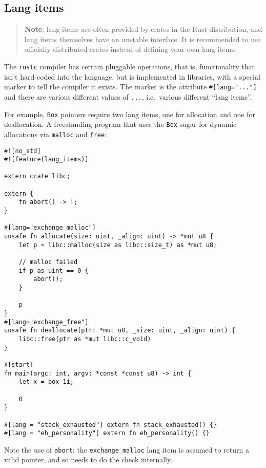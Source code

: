 \documentclass[]{article}
\begin{document}
\subsection{Lang items}\label{lang-items}

\begin{quote}
\textbf{Note}: lang items are often provided by crates in the Rust
distribution, and lang items themselves have an unstable interface. It
is recommended to use officially distributed crates instead of defining
your own lang items.
\end{quote}

The \texttt{rustc} compiler has certain pluggable operations, that is,
functionality that isn't hard-coded into the language, but is
implemented in libraries, with a special marker to tell the compiler it
exists. The marker is the attribute \texttt{\#{[}lang="..."{]}} and
there are various different values of \texttt{...}, i.e.~various
different ``lang items''.

For example, \texttt{Box} pointers require two lang items, one for
allocation and one for deallocation. A freestanding program that uses
the \texttt{Box} sugar for dynamic allocations via \texttt{malloc} and
\texttt{free}:

\begin{verbatim}
#![no_std]
#![feature(lang_items)]

extern crate libc;

extern {
    fn abort() -> !;
}

#[lang="exchange_malloc"]
unsafe fn allocate(size: uint, _align: uint) -> *mut u8 {
    let p = libc::malloc(size as libc::size_t) as *mut u8;

    // malloc failed
    if p as uint == 0 {
        abort();
    }

    p
}
#[lang="exchange_free"]
unsafe fn deallocate(ptr: *mut u8, _size: uint, _align: uint) {
    libc::free(ptr as *mut libc::c_void)
}

#[start]
fn main(argc: int, argv: *const *const u8) -> int {
    let x = box 1i;

    0
}

#[lang = "stack_exhausted"] extern fn stack_exhausted() {}
#[lang = "eh_personality"] extern fn eh_personality() {}
\end{verbatim}

Note the use of \texttt{abort}: the \texttt{exchange\_malloc} lang item
is assumed to return a valid pointer, and so needs to do the check
internally.
\end{document}
